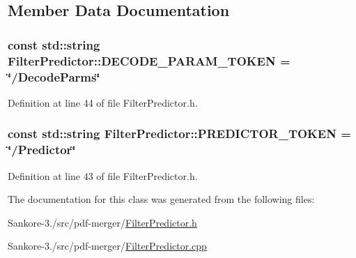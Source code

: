 \subsection{Member Data Documentation}
\hypertarget{classmerge__lib_1_1_filter_predictor_aa827dbf05230cde8051f66721ee78c47}{
\subsubsection[{D\-E\-C\-O\-D\-E\-\_\-\-P\-A\-R\-A\-M\-\_\-\-T\-O\-K\-E\-N}]{\setlength{\rightskip}{0pt plus 5cm}const std\-::string Filter\-Predictor\-::\-D\-E\-C\-O\-D\-E\-\_\-\-P\-A\-R\-A\-M\-\_\-\-T\-O\-K\-E\-N = \char`\"{}/Decode\-Parms\char`\"{}\hspace{0.3cm}{\ttfamily [static]}}}\label{d5/d5f/classmerge__lib_1_1_filter_predictor_aa827dbf05230cde8051f66721ee78c47}


Definition at line 44 of file Filter\-Predictor.\-h.

\hypertarget{classmerge__lib_1_1_filter_predictor_a97bd51acd9ad395562dfcfeea4452e13}{
\subsubsection[{P\-R\-E\-D\-I\-C\-T\-O\-R\-\_\-\-T\-O\-K\-E\-N}]{\setlength{\rightskip}{0pt plus 5cm}const std\-::string Filter\-Predictor\-::\-P\-R\-E\-D\-I\-C\-T\-O\-R\-\_\-\-T\-O\-K\-E\-N = \char`\"{}/Predictor\char`\"{}\hspace{0.3cm}{\ttfamily [static]}}}\label{d5/d5f/classmerge__lib_1_1_filter_predictor_a97bd51acd9ad395562dfcfeea4452e13}


Definition at line 43 of file Filter\-Predictor.\-h.



The documentation for this class was generated from the following files\-:\begin{DoxyCompactItemize}
\item 
Sankore-\/3./src/pdf-\/merger/\hyperlink{_filter_predictor_8h}{Filter\-Predictor.\-h}\item 
Sankore-\/3./src/pdf-\/merger/\hyperlink{_filter_predictor_8cpp}{Filter\-Predictor.\-cpp}\end{DoxyCompactItemize}
